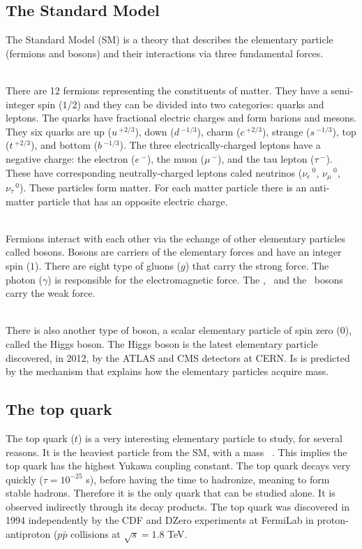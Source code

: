 \newpage

\subsection{The Standard Model}
\label{sec:StandardModel}

The Standard Model (SM) is a theory that describes the elementary particle (fermions and bosons) and their interactions via three fundamental forces. 

\ \\There are 12 fermions representing the constituents of matter. They have a semi-integer spin ($1/2$) and they can be divided into two categories: quarks and leptons. The quarks have fractional electric charges and form barions and mesons. They six quarks are up ($u\,^{+2/3}$), down ($d\,^{-1/3}$), charm ($c\,^{+2/3}$), strange ($s\,^{-1/3}$), top ($t\,^{+2/3}$), and bottom ($b\,^{-1/3}$). The three electrically-charged leptons have a negative charge: the electron ($e\,^{-}$), the muon ($\mu\,^{-}$), and the tau lepton ($\tau\,^{-}$). These have corresponding neutrally-charged leptons caled neutrinos ($\nu_e\,^0$, $\nu_\mu\,^0$, $\nu_\tau\,^0$). These particles form matter. For each matter particle there is an anti-matter particle that has an opposite electric charge. 

\ \\Fermions interact with each other via the echange of other elementary particles called bosons. Bosons are carriers of the elementary forces and have an integer spin ($1$). There are eight type of gluons ($g$) that carry the strong force. The photon ($\gamma$) is responsible for the electromagnetic force. The \Wplus, \Wminus~and the \Zzero~bosons carry the weak force. 

\ \\There is also another type of boson, a scalar elementary particle of spin zero (0), called the Higgs boson. The Higgs boson is the latest elementary particle discovered, in 2012, by the ATLAS and CMS detectors at CERN. Is is predicted by the mechanism that explains how the elementary particles acquire mass.

\subsection{The top quark}
\label{sec:TopQuark}

The top quark ($t$) is a very interesting elementary particle to study, for several reasons. It is the heaviest particle from the SM, with a mass ~\GeVcc. This implies the top quark has the highest Yukawa coupling constant. The top quark decays very quickly ($\tau=10^{-25}$ s), before having the time to hadronize, meaning to form stable hadrons. Therefore it is the only quark that can be studied alone. It is observed indirectly through its decay products. The top quark was discovered in 1994 independently by the CDF and DZero experiments at FermiLab in proton-antiproton ($p\bar{p}$ collisions at $\sqrt{s}=1.8$ TeV.

